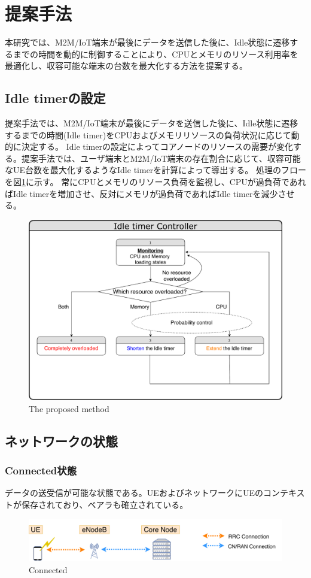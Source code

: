 \documentclass[a4j]{ujarticle}
\begin{document}
\clearpage
\section{提案手法}
  本研究では、M2M/IoT端末が最後にデータを送信した後に、Idle状態に遷移するまでの時間を動的に制御することにより、CPUとメモリのリソース利用率を最適化し、収容可能な端末の台数を最大化する方法を提案する。
\subsection{Idle timerの設定}
  提案手法では、M2M/IoT端末が最後にデータを送信した後に、Idle状態に遷移するまでの時間(Idle timer)をCPUおよびメモリリソースの負荷状況に応じて動的に決定する。
  Idle timerの設定によってコアノードのリソースの需要が変化する。提案手法では、ユーザ端末とM2M/IoT端末の存在割合に応じて、収容可能なUE台数を最大化するようなIdle timerを計算によって導出する。
  処理のフローを図\ref{proposed_method}に示す。
  常にCPUとメモリのリソース負荷を監視し、CPUが過負荷であればIdle timerを増加させ、反対にメモリが過負荷であればIdle timerを減少させる。
  \begin{figure}[htbp]
    \centering
    \includegraphics[width=0.7\hsize]{proposed_method.pdf}
    \caption{The proposed method}
    \label{proposed_method}
  \end{figure}

  \clearpage
  \subsection{ネットワークの状態}
  \subsubsection{Connected状態}
    データの送受信が可能な状態である。UEおよびネットワークにUEのコンテキストが保存されており、ベアラも確立されている。
    \begin{figure}[htbp]
      \centering
      \includegraphics[width=0.7\hsize]{Connected.pdf}
      \caption{Connected}
      \label{Connected}
    \end{figure}
\end{document}
